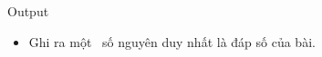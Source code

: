 Output
\begin{itemize}
	\item     Ghi ra một  số nguyên duy nhất là đáp số của bài.   
\end{itemize}